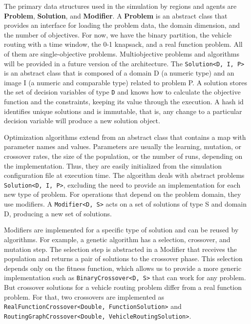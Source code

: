 \documentclass[preprint,12pt]{elsarticle}
\begin{document}
The primary data structures used in the simulation by regions and agents are \textbf{Problem}, \textbf{Solution}, and \textbf{Modifier}. A \textbf{Problem} is an abstract class that provides an interface for loading the problem data, the domain dimension, and the number of objectives. For now, we have the binary partition, the vehicle routing with a time window, the 0-1 knapsack, and a real function problem. All of them are single-objective problems. Multiobjective problems and algorithms will be provided in a future version of the architecture. The \texttt{Solution<D, I, P>} is an abstract class that is composed of a domain D (a numeric type) and an image I (a numeric and comparable type) related to problem P. A solution stores the set of decision variables of type \texttt{D} and knows how to calculate the objective function and the constraints, keeping its value through the execution. A hash id identifies unique solutions and is immutable, that is, any change to a particular decision variable will produce a new solution object.  

Optimization algorithms extend from an abstract class that contains a map with parameter names and values. Parameters are usually the learning, mutation, or crossover rates, the size of the population, or the number of runs, depending on the implementation. Thus, they are easily initialized from the simulation configuration file at execution time. 
The algorithm deals with abstract problems \texttt{Solution<D, I, P>}, excluding the need to provide an implementation for each new type of problem. For operations that depend on the problem domain, they use modifiers. A \texttt{Modifier<D, S>} acts on a set of solutions of type S and domain D, producing a new set of solutions. 

Modifiers are implemented for a specific type of solution and can be reused by algorithms. For example, a genetic algorithm has a selection, crossover, and mutation step. The selection step is abstracted in a Modifier that receives the population and returns a pair of solutions to the crossover phase. This selection depends only on the fitness function, which allows us to provide a more generic implementation such as \texttt{BinaryCrossover<D, S>} that can work for any problem. But crossover solutions for a vehicle routing problem differ from a real function problem.  For that, two crossovers are implemented as \texttt{RealFunctionCrossover<Double, FunctionSolution>} and \texttt{RoutingGraphCrossover<Double, VehicleRoutingSolution>}.
\end{document}
